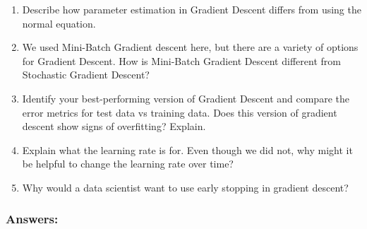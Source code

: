 \documentclass[11pt]{article}
\begin{document}
    \begin{enumerate}
\def\labelenumi{\arabic{enumi})}
\item
  Describe how parameter estimation in Gradient Descent differs from
  using the normal equation.
\item
  We used Mini-Batch Gradient descent here, but there are a variety of
  options for Gradient Descent. How is Mini-Batch Gradient Descent
  different from Stochastic Gradient Descent?
\item
  Identify your best-performing version of Gradient Descent and compare
  the error metrics for test data vs training data. Does this version of
  gradient descent show signs of overfitting? Explain.
\item
  Explain what the learning rate is for. Even though we did not, why
  might it be helpful to change the learning rate over time?
\item
  Why would a data scientist want to use early stopping in gradient
  descent?
\end{enumerate}

    \hypertarget{answers}{%
\subsubsection{Answers:}\label{answers}}
\end{document}
